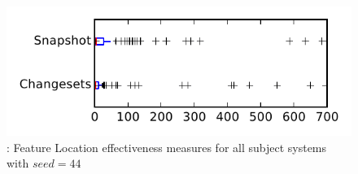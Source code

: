 
\begin{figure}
\centering
\includegraphics[height=0.4\textheight]{figures/flt_seed/rq1_tiny_44}
\caption{\rone: Feature Location effectiveness measures for all subject systems with $seed=44$}
\label{fig:flt_seed:rq1:tiny}
\end{figure}
